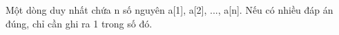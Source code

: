 Một dòng duy nhất chứa n số nguyên a[1], a[2], ..., a[n]. Nếu có nhiều đáp án đúng, chỉ cần ghi ra 1 trong số đó.